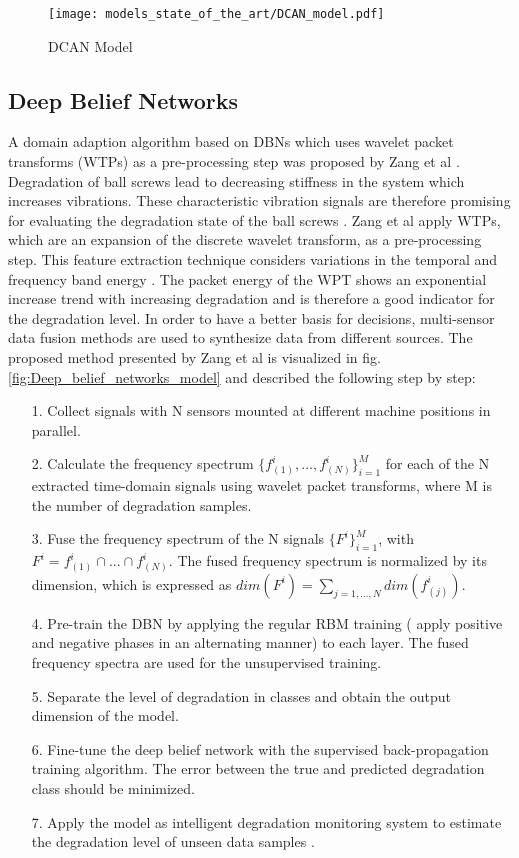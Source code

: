 \begin{figure}[H]
  \centering
  \texttt{[image: models\_state\_of\_the\_art/DCAN\_model.pdf]}
  \caption{DCAN Model \cite{li2020}}
  \label{fig:DCAN_model}
\end{figure}

\subsection{Deep Belief Networks}
A domain adaption algorithm based on DBNs which uses wavelet packet transforms (WTPs) as a pre-processing step was proposed by Zang et al \cite{Zhang2017}. Degradation of ball screws lead to decreasing stiffness in the system which increases vibrations. These characteristic vibration signals are therefore promising for evaluating the degradation state of the ball screws \cite{Zhang2017}. Zang et al apply WTPs, which are an expansion of the discrete wavelet transform, as a pre-processing step. This feature extraction technique considers variations in the temporal and frequency band energy \cite{Besbes2016}. The packet energy of the WPT shows an exponential increase trend with increasing degradation and is therefore a good indicator for the degradation level. In order to have a better basis for decisions, multi-sensor data fusion methods are used to synthesize data from different sources. The proposed method presented by Zang et al is visualized in fig. \ref{fig:Deep_belief_networks_model} and described the following step by step:

\begin{itemize}
    \item [1.] Collect signals with N sensors mounted at different machine positions in parallel.
    \item [2.] Calculate the frequency spectrum $\{f_{(1)}^{i}, ..., f_{(N)}^{i}\}_{i=1}^{M}$ for each of the N extracted time-domain signals using wavelet packet transforms, where M is the number of degradation samples.
    \item [3.] Fuse the frequency spectrum of the N signals $\{F^{i}\}_{i=1}^{M}$, with $F^{i}=f_{(1)}^{i} \cap ... \cap f_{(N)}^{i}$. The fused frequency spectrum is normalized by its dimension, which is expressed as $dim(F^{i})=\sum_{j=1,...,N} dim(f_{(j)}^{i})$.
    \item [4.] Pre-train the DBN by applying the regular RBM training ( apply positive and negative phases in an alternating manner) to each layer. The fused frequency spectra are used for the unsupervised training. 
    \item [5.] Separate the level of degradation in classes and obtain the output dimension of the model.
    \item [6.]  Fine-tune the deep belief network with the supervised back-propagation training algorithm. The error between the true and predicted degradation class should be minimized.
    \item [7.] Apply the model as intelligent degradation monitoring system to estimate the degradation level of unseen data samples \cite{Zhang2017}.
\end{itemize}

